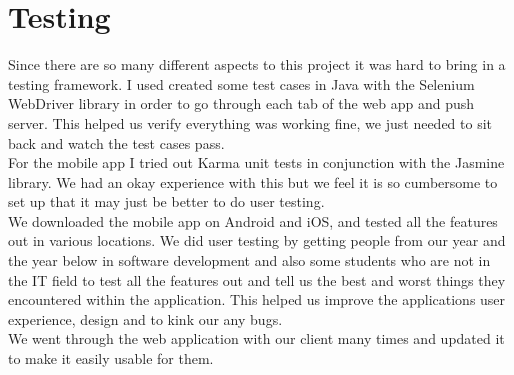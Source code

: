 \section{Testing}
Since there are so many different aspects to this project it was hard to bring in a testing framework.
I used created some test cases in Java with the Selenium WebDriver library in order to go through each tab of the web app and push server.
This helped us verify everything was working fine, we just needed to sit back and watch the test cases pass.
\\
For the mobile app I tried out Karma unit tests in conjunction with the Jasmine library.
We had an okay experience with this but we feel it is so cumbersome to set up that it may just be better to do user testing.
\\
We downloaded the mobile app on Android and iOS, and tested all the features out in various locations.
We did user testing by getting people from our year and the year below in software development and also some students who are not in the IT field to test all the features out and tell us the best and worst things they encountered within the application. 
This helped us improve the applications user experience, design and to kink our any bugs.
\\
We went through the web application with our client many times and updated it to make it easily usable for them.

